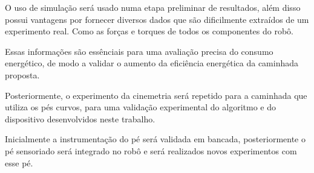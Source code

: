 O uso de simulação será usado numa etapa preliminar de resultados, além disso possui vantagens por fornecer diversos dados que são dificilmente extraídos de um experimento real. Como as forças e torques de todos os componentes do robô. 

Essas informações são essênciais para uma  avaliação precisa do consumo energético, de modo a validar o aumento da eficiência energética da caminhada proposta.

Posteriormente, o experimento da cinemetria será repetido para a caminhada que utiliza os pés curvos, para uma validação experimental do algoritmo e do dispositivo desenvolvidos neste trabalho.

Inicialmente a instrumentação do pé será validada em bancada, posteriormente o pé sensoriado será integrado no robô e será realizados novos experimentos com esse pé. 


\newpage



\printbibliography
